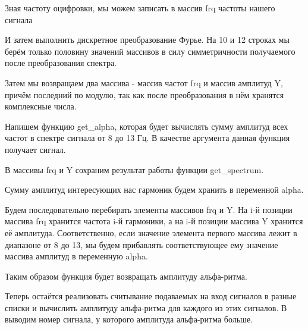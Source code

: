 Зная частоту оцифровки, мы можем записать в массив frq частоты нашего сигнала

И затем выполнить дискретное преобразование Фурье. На 10 и 12 строках мы берём только половину значений массивов в силу симметричности получаемого после преобразования спектра.

Затем мы возвращаем два массива - массив частот frq и массив амплитуд Y, причём последний по модулю, так как после преобразования в нём хранятся комплексные числа.

Напишем функцию get\_alpha, которая будет вычислять сумму амплитуд всех частот в спектре сигнала от 8 до 13 Гц. В качестве аргумента данная функция получает сигнал.

В массивы frq и Y сохраним результат работы функции get\_spectrum.

Сумму амплитуд интересующих нас гармоник будем хранить в переменной alpha.

Будем последовательно перебирать элементы массивов frq и Y. На i-й позиции массива frq хранится частота i-й гармоники, а на i-й позиции массива Y хранится её амплитуда. Соответственно, если значение элемента первого массива лежит в диапазоне от 8 до 13, мы будем прибавлять соответствующее ему значение массива амплитуд в переменную alpha.

Таким образом функция будет возвращать амплитуду альфа-ритма.

Теперь остаётся реализовать считывание подаваемых на вход сигналов в разные списки и вычислить амплитуду альфа-ритма для каждого из этих сигналов. В выводим номер сигнала, у которого амплитуда альфа-ритма больше.




